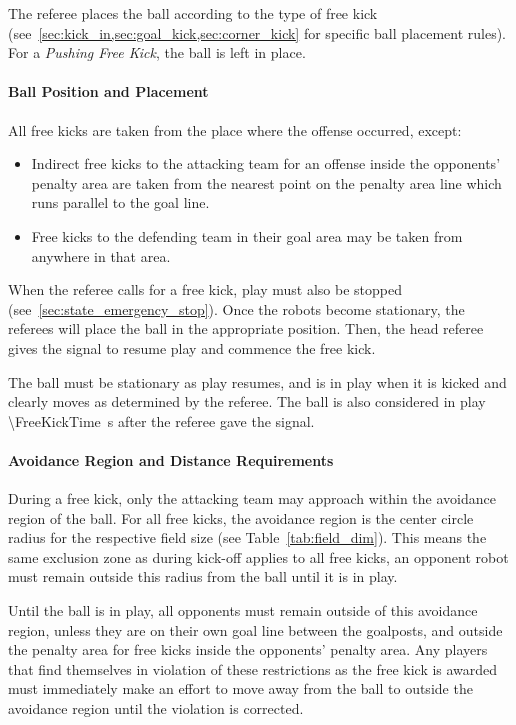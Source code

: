 The referee places the ball according to the type of free kick (see~\cref{sec:kick_in,sec:goal_kick,sec:corner_kick} for specific ball placement rules).
For a \emph{Pushing Free Kick}, the ball is left in place.

\paragraph{Ball Position and Placement}
All free kicks are taken from the place where the offense occurred, except:
\begin{itemize}
\item Indirect free kicks to the attacking team for an offense inside the opponents' penalty area are taken from the nearest point on the penalty area line which runs parallel to the goal line.
\item Free kicks to the defending team in their goal area may be taken from anywhere in that area.
\end{itemize}

When the referee calls for a free kick, play must also be stopped (see~\cref{sec:state_emergency_stop}). Once the robots become stationary, the referees will place the ball in the appropriate position. Then, the head referee gives the signal to resume play and commence the free kick.

The ball must be stationary as play resumes, and is in play when it is kicked and clearly moves as determined by the referee. The ball is also considered in play \qty{\FreeKickTime}{\second} after the referee gave the signal.

\paragraph{Avoidance Region and Distance Requirements}
During a free kick, only the attacking team may approach within the avoidance region of the ball. For all free kicks, the avoidance region is the center circle radius for the respective field size (see Table~\ref{tab:field_dim}). This means the same exclusion zone as during kick-off applies to all free kicks, an opponent robot must remain outside this radius from the ball until it is in play.

Until the ball is in play, all opponents must remain outside of this avoidance region, unless they are on their own goal line between the goalposts, and outside the penalty area for free kicks inside the opponents' penalty area. Any players that find themselves in violation of these restrictions as the free kick is awarded must immediately make an effort to move away from the ball to outside the avoidance region until the violation is corrected. 

